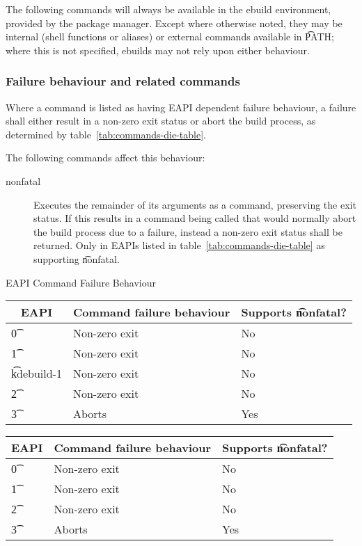 \label{sec:pkg-mgr-commands}

The following commands will always be available in the ebuild environment, provided by the package
manager. Except where otherwise noted, they may be internal (shell functions or aliases) or external
commands available in \t{PATH}; where this is not specified, ebuilds may not rely upon either
behaviour.

\subsubsection{Failure behaviour and related commands}
\label{sec:failure-behaviour}

 Where a command is listed as having EAPI dependent failure behaviour,
a failure shall either result in a non-zero exit status or abort the build process, as determined by
table~\ref{tab:commands-die-table}.

The following commands affect this behaviour:
\begin{description}
\item[nonfatal]  Executes the remainder of its arguments as a command,
    preserving the exit status. If this results in a command being called that would normally abort
    the build process due to a failure, instead a non-zero exit status shall be returned. Only in
    EAPIs listed in table~\ref{tab:commands-die-table} as supporting \t{nonfatal}.
\end{description}

\begin{centertable}{EAPI Command Failure Behaviour} \label{tab:commands-die-table}
\IFKDEBUILDELSE
{
    \begin{tabular}{ l l l }
        \toprule
            \multicolumn{1}{c}{\textbf{EAPI}} &
            \multicolumn{1}{c}{\textbf{Command failure behaviour}} &
            \multicolumn{1}{c}{\textbf{Supports \t{nonfatal}?}} \\
            \midrule
    \t{0} & Non-zero exit & No \\
    \t{1} & Non-zero exit & No \\
    \t{kdebuild-1} & Non-zero exit & No \\
    \t{2} & Non-zero exit & No \\
    \t{3} & Aborts & Yes \\
    \bottomrule
    \end{tabular}
}{
    \begin{tabular}{ l l l }
        \toprule
            \multicolumn{1}{c}{\textbf{EAPI}} &
            \multicolumn{1}{c}{\textbf{Command failure behaviour}} &
            \multicolumn{1}{c}{\textbf{Supports \t{nonfatal}?}} \\
            \midrule
    \t{0} & Non-zero exit & No \\
    \t{1} & Non-zero exit & No \\
    \t{2} & Non-zero exit & No \\
    \t{3} & Aborts & Yes \\
    \bottomrule
    \end{tabular}
}
\end{centertable}

